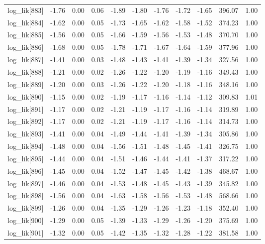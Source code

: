 \begin{table}[ht]
\begin{tabular}{rrrrrrrrrrr}
  log\_lik[883] & -1.76 & 0.00 & 0.06 & -1.89 & -1.80 & -1.76 & -1.72 & -1.65 & 396.07 & 1.00 \\ 
  log\_lik[884] & -1.62 & 0.00 & 0.05 & -1.73 & -1.65 & -1.62 & -1.58 & -1.52 & 374.23 & 1.00 \\ 
  log\_lik[885] & -1.56 & 0.00 & 0.05 & -1.66 & -1.59 & -1.56 & -1.53 & -1.48 & 370.70 & 1.00 \\ 
  log\_lik[886] & -1.68 & 0.00 & 0.05 & -1.78 & -1.71 & -1.67 & -1.64 & -1.59 & 377.96 & 1.00 \\ 
  log\_lik[887] & -1.41 & 0.00 & 0.03 & -1.48 & -1.43 & -1.41 & -1.39 & -1.34 & 327.56 & 1.00 \\ 
  log\_lik[888] & -1.21 & 0.00 & 0.02 & -1.26 & -1.22 & -1.20 & -1.19 & -1.16 & 349.43 & 1.00 \\ 
  log\_lik[889] & -1.20 & 0.00 & 0.03 & -1.26 & -1.22 & -1.20 & -1.18 & -1.16 & 348.16 & 1.00 \\ 
  log\_lik[890] & -1.15 & 0.00 & 0.02 & -1.19 & -1.17 & -1.16 & -1.14 & -1.12 & 309.83 & 1.01 \\ 
  log\_lik[891] & -1.17 & 0.00 & 0.02 & -1.21 & -1.19 & -1.17 & -1.16 & -1.14 & 319.89 & 1.00 \\ 
  log\_lik[892] & -1.17 & 0.00 & 0.02 & -1.21 & -1.19 & -1.17 & -1.16 & -1.14 & 314.73 & 1.00 \\ 
  log\_lik[893] & -1.41 & 0.00 & 0.04 & -1.49 & -1.44 & -1.41 & -1.39 & -1.34 & 305.86 & 1.00 \\ 
  log\_lik[894] & -1.48 & 0.00 & 0.04 & -1.56 & -1.51 & -1.48 & -1.45 & -1.41 & 326.75 & 1.00 \\ 
  log\_lik[895] & -1.44 & 0.00 & 0.04 & -1.51 & -1.46 & -1.44 & -1.41 & -1.37 & 317.22 & 1.00 \\ 
  log\_lik[896] & -1.45 & 0.00 & 0.04 & -1.52 & -1.47 & -1.45 & -1.42 & -1.38 & 468.67 & 1.00 \\ 
  log\_lik[897] & -1.46 & 0.00 & 0.04 & -1.53 & -1.48 & -1.45 & -1.43 & -1.39 & 345.82 & 1.00 \\ 
  log\_lik[898] & -1.56 & 0.00 & 0.04 & -1.63 & -1.58 & -1.56 & -1.53 & -1.48 & 568.66 & 1.00 \\ 
  log\_lik[899] & -1.26 & 0.00 & 0.04 & -1.35 & -1.29 & -1.26 & -1.23 & -1.18 & 352.40 & 1.00 \\ 
  log\_lik[900] & -1.29 & 0.00 & 0.05 & -1.39 & -1.33 & -1.29 & -1.26 & -1.20 & 375.69 & 1.00 \\ 
  log\_lik[901] & -1.32 & 0.00 & 0.05 & -1.42 & -1.35 & -1.32 & -1.28 & -1.22 & 381.58 & 1.00 \\ 

\end{tabular}
\end{table}
